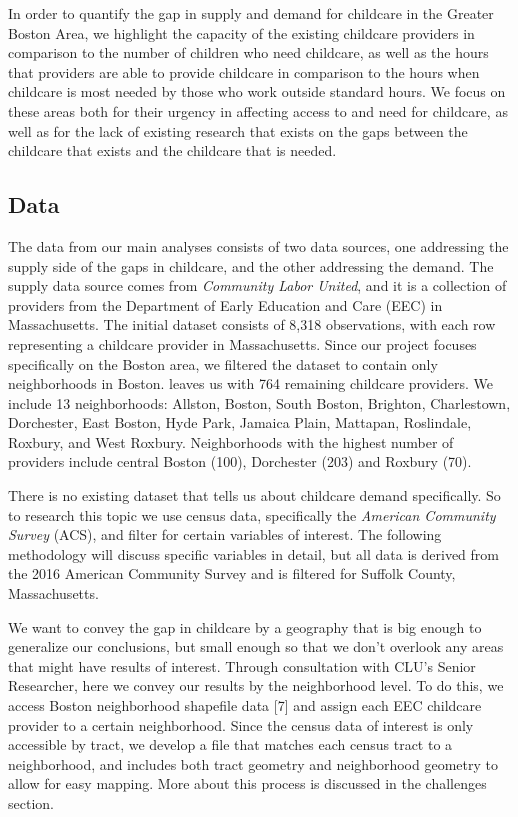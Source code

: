 \documentclass[10pt,letterpaper]{article}
\begin{document}
In order to quantify the gap in supply and demand for childcare in the
Greater Boston Area, we highlight the capacity of the existing childcare
providers in comparison to the number of children who need childcare, as
well as the hours that providers are able to provide childcare in
comparison to the hours when childcare is most needed by those who work
outside standard hours. We focus on these areas both for their urgency
in affecting access to and need for childcare, as well as for the lack
of existing research that exists on the gaps between the childcare that
exists and the childcare that is needed.

\subsection{Data}\label{data}

The data from our main analyses consists of two data sources, one
addressing the supply side of the gaps in childcare, and the other
addressing the demand. The supply data source comes from \emph{Community
Labor United}, and it is a collection of providers from the Department
of Early Education and Care (EEC) in Massachusetts. The initial dataset
consists of 8,318 observations, with each row representing a childcare
provider in Massachusetts. Since our project focuses specifically on the
Boston area, we filtered the dataset to contain only neighborhoods in
Boston. leaves us with 764 remaining childcare providers. We include 13
neighborhoods: Allston, Boston, South Boston, Brighton, Charlestown,
Dorchester, East Boston, Hyde Park, Jamaica Plain, Mattapan, Roslindale,
Roxbury, and West Roxbury. Neighborhoods with the highest number of
providers include central Boston (100), Dorchester (203) and Roxbury
(70).

There is no existing dataset that tells us about childcare demand
specifically. So to research this topic we use census data, specifically
the \emph{American Community Survey} (ACS), and filter for certain
variables of interest. The following methodology will discuss specific
variables in detail, but all data is derived from the 2016 American
Community Survey and is filtered for Suffolk County, Massachusetts.

We want to convey the gap in childcare by a geography that is big enough
to generalize our conclusions, but small enough so that we don't
overlook any areas that might have results of interest. Through
consultation with CLU's Senior Researcher, here we convey our results by
the neighborhood level. To do this, we access Boston neighborhood
shapefile data {[}7{]} and assign each EEC childcare provider to a
certain neighborhood. Since the census data of interest is only
accessible by tract, we develop a file that matches each census tract to
a neighborhood, and includes both tract geometry and neighborhood
geometry to allow for easy mapping. More about this process is discussed
in the challenges section.
\end{document}
